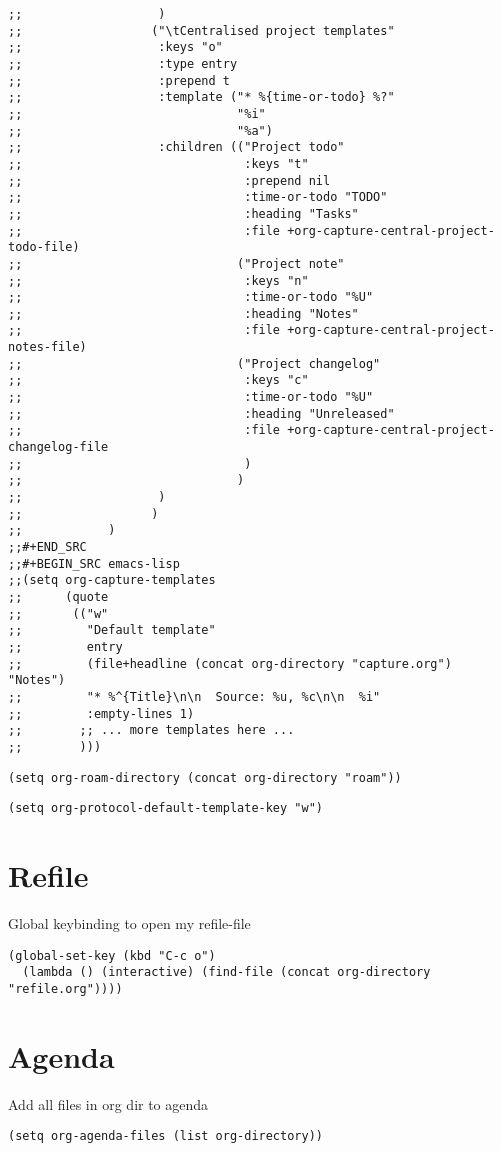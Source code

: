 \documentclass[11pt]{article}
\begin{document}
\begin{verbatim}
;;                   )
;;                  ("\tCentralised project templates"
;;                   :keys "o"
;;                   :type entry
;;                   :prepend t
;;                   :template ("* %{time-or-todo} %?"
;;                              "%i"
;;                              "%a")
;;                   :children (("Project todo"
;;                               :keys "t"
;;                               :prepend nil
;;                               :time-or-todo "TODO"
;;                               :heading "Tasks"
;;                               :file +org-capture-central-project-todo-file)
;;                              ("Project note"
;;                               :keys "n"
;;                               :time-or-todo "%U"
;;                               :heading "Notes"
;;                               :file +org-capture-central-project-notes-file)
;;                              ("Project changelog"
;;                               :keys "c"
;;                               :time-or-todo "%U"
;;                               :heading "Unreleased"
;;                               :file +org-capture-central-project-changelog-file
;;                               )
;;                              )
;;                   )
;;                  )
;;            )
;;#+END_SRC
;;#+BEGIN_SRC emacs-lisp
;;(setq org-capture-templates
;;      (quote
;;       (("w"
;;         "Default template"
;;         entry
;;         (file+headline (concat org-directory "capture.org") "Notes")
;;         "* %^{Title}\n\n  Source: %u, %c\n\n  %i"
;;         :empty-lines 1)
;;        ;; ... more templates here ...
;;        )))
\end{verbatim}
\begin{verbatim}
(setq org-roam-directory (concat org-directory "roam"))
\end{verbatim}
\begin{verbatim}
(setq org-protocol-default-template-key "w")
\end{verbatim}
\section{Refile}
\label{sec:org5f74f78}
Global keybinding to open my refile-file
\begin{verbatim}
(global-set-key (kbd "C-c o")
  (lambda () (interactive) (find-file (concat org-directory "refile.org"))))
\end{verbatim}
\section{Agenda}
\label{sec:org29cfa35}
Add all files in org dir to agenda
\begin{verbatim}
(setq org-agenda-files (list org-directory))
\end{verbatim}
\end{document}
